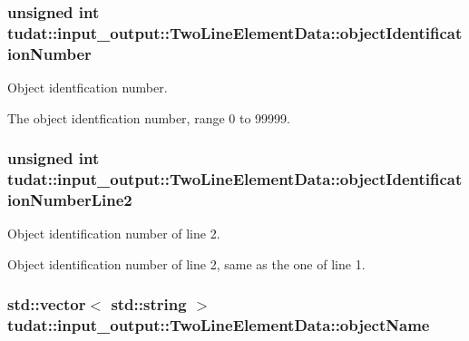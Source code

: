 \subsubsection[{\texorpdfstring{object\+Identification\+Number}{objectIdentificationNumber}}]{\setlength{\rightskip}{0pt plus 5cm}unsigned int tudat\+::input\+\_\+output\+::\+Two\+Line\+Element\+Data\+::object\+Identification\+Number}\hypertarget{structtudat_1_1input__output_1_1TwoLineElementData_ae4b58f77c8a356b14bee9e7a668f97ca}{}\label{structtudat_1_1input__output_1_1TwoLineElementData_ae4b58f77c8a356b14bee9e7a668f97ca}


Object identfication number. 

The object identfication number, range 0 to 99999. 
\subsubsection[{\texorpdfstring{object\+Identification\+Number\+Line2}{objectIdentificationNumberLine2}}]{\setlength{\rightskip}{0pt plus 5cm}unsigned int tudat\+::input\+\_\+output\+::\+Two\+Line\+Element\+Data\+::object\+Identification\+Number\+Line2}\hypertarget{structtudat_1_1input__output_1_1TwoLineElementData_a6e47168e40eeb1ec03f2f659783ff0fa}{}\label{structtudat_1_1input__output_1_1TwoLineElementData_a6e47168e40eeb1ec03f2f659783ff0fa}


Object identification number of line 2. 

Object identification number of line 2, same as the one of line 1. 
\subsubsection[{\texorpdfstring{object\+Name}{objectName}}]{\setlength{\rightskip}{0pt plus 5cm}std\+::vector$<$ std\+::string $>$ tudat\+::input\+\_\+output\+::\+Two\+Line\+Element\+Data\+::object\+Name}\hypertarget{structtudat_1_1input__output_1_1TwoLineElementData_adaee5e323d5ad87b94539728ac234474}{}\label{structtudat_1_1input__output_1_1TwoLineElementData_adaee5e323d5ad87b94539728ac234474}


